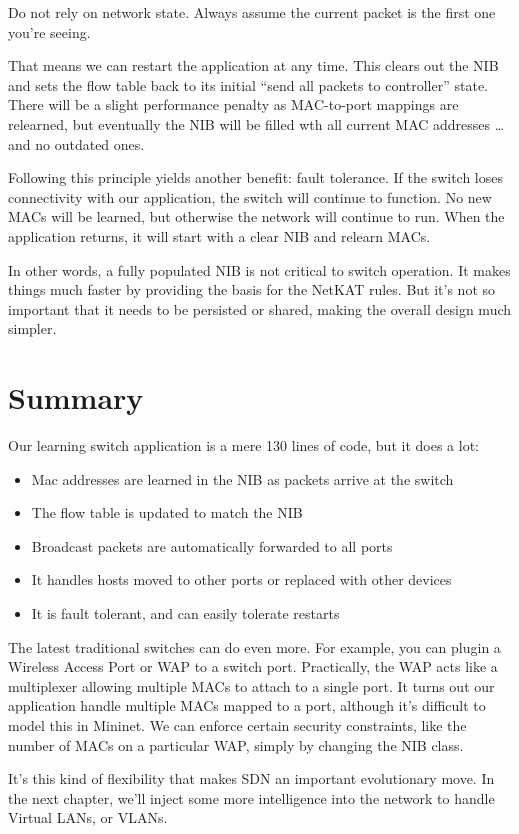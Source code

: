 \begin{principle}
Do not rely on network state.  Always assume the current packet is the first one you're seeing.   
\end{principle}
 
That means we can restart the application at any time.  This clears out the NIB and sets the flow table
back to its initial ``send all packets to controller'' state.  
There will be a slight performance penalty as MAC-to-port mappings are relearned, but eventually the
NIB will be filled wth all current MAC addresses \ldots and no outdated ones.

Following this principle yields another benefit: fault tolerance.  If the switch loses connectivity with 
our application, the switch will continue to function.  No new MACs will be learned, but otherwise the 
network will continue to run.  When the application returns, it will start with a clear NIB and relearn MACs.  

In other words, a fully populated NIB is not critical to switch operation.  It makes things much faster
by providing the basis for the NetKAT rules.  But it's not so important that it needs to be persisted or
shared, making the overall design much simpler.  

\section{Summary}

Our learning switch application is a mere 130 lines of code, but it does a lot:

\begin{itemize}
\item Mac addresses are learned in the NIB as packets arrive at the switch
\item The flow table is updated to match the NIB
\item Broadcast packets are automatically forwarded to all ports
\item It handles hosts moved to other ports or replaced with other devices
\item It is fault tolerant, and can easily tolerate restarts
\end{itemize}

The latest traditional switches can do even more.  For example, you can plugin a Wireless Access Port or 
WAP to a switch port.  Practically, the WAP acts like a multiplexer allowing multiple MACs to 
attach to a single port.   It turns out our application handle multiple MACs mapped to a port, although it's 
difficult to model this in Mininet.  We can enforce certain security constraints, like the number of MACs on
a particular WAP, simply by changing the NIB class.

It's this kind of flexibility that makes SDN an important evolutionary move.  In the next chapter, we'll
inject some more intelligence into the network to handle Virtual LANs, or VLANs. 
